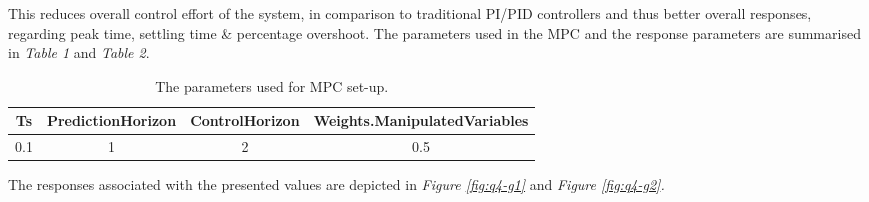 \documentclass[11pt, onecolumn]{article}
\begin{document}
\par This reduces overall control effort of the system, in comparison to traditional PI/PID controllers and thus better overall responses, regarding peak time, settling time \& percentage overshoot. The parameters used in the MPC and the response parameters are summarised in \textit{Table 1} and \textit{Table 2}.
\begin{table}[h!]
    \centering
    \begin{tabular}{| c | c | c | c |}
        \hline
        \textbf{Ts} & \textbf{PredictionHorizon} & \textbf{ControlHorizon} & \textbf{Weights.ManipulatedVariables} \\
        \hline
        0.1         & 1                          & 2                       & 0.5                                   \\
        \hline
    \end{tabular}
    \caption{The parameters used for MPC set-up.}
    \label{table:simulation-inputs}
\end{table}
\begin{table}[h!]
    \caption{The parameters used for MPC set-up.}
    \label{table:simulation-inputs}
\end{table}
\par The responses associated with the presented values are depicted in \textit{Figure \ref{fig:q4-g1}} and \textit{Figure \ref{fig:q4-g2}.}
\end{document}
